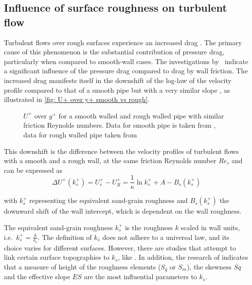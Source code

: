 \subsection{Influence of surface roughness on turbulent flow}\label{subsec: Roughness influence on turbulent flow}
Turbulent flows over rough surfaces experience an increased drag \citep{chungPredictingDragRough2021}.
The primary cause of this phenomenon is the substantial contribution of  pressure drag,  particularly when compared to smooth-wall cases.
The investigations by~\cite{macdonaldTurbulentFlowTransitionally2016} indicate a significant influence of the pressure drag compared to drag by wall friction.
The increased drag manifests itself in the downshift of the log-law of the velocity profile compared to that of a smooth pipe but with a very similar slope , as illustrated  in \autoref{fig: U+ over y+ smooth vs rough}.
\begin{figure}
    \centering
    
    \caption{$U^+$ over $y^+$ for a smooth walled and rough walled pipe with similar friction Reynolds numbers. Data for smooth pipe is taken from \cite{yaoDirectNumericalSimulations2023}, data for rough walled pipe taken from \cite{demaioDirectNumericalSimulation2023}}
    \label{fig: U+ over y+ smooth vs rough}
\end{figure}
This downshift is the difference between the velocity profiles of turbulent flows with a smooth and a rough wall, at the same friction Reynolds number $Re_{\tau}$ and can be expressed as
\begin{equation}
    \Delta U^+(k_s^+) = U_s^+ - U_R^+ = \frac{1}{\kappa}\ln{k_s^+} + A - B_s(k_s^+) 
\end{equation}

with $k_s^+$ representing the equivalent sand-grain roughness and $B_s(k_s^+)$ the downward shift of the wall intercept, which is dependent on the wall roughness.

The equivalent sand-grain roughness $k_s^+$ is the roughness $k$ scaled in wall units, i.e.\ $\displaystyle k_s^+ = \frac{k}{\delta_{\nu}}$.
The definition of $k_s$ does not adhere to a universal law, and its choice varies for different surfaces. However, there are studies that attempt to link certain surface topographies to $k_s$, like \cite{flackReviewHydraulicRoughness2010}.
In addition, the research of \cite{flackSkinFrictionMeasurements2020} indicates that a measure of height of the roughness elements ($S_q$ or $S_m$), the skewness $Sq$ and the effective slope $ES$ are the most influential parameters to $k_s$.


